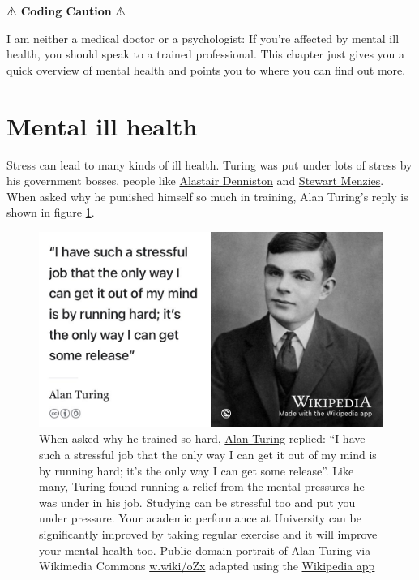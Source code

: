 \documentclass[
]{book}
\begin{document}
⚠️ \textbf{Coding Caution} ⚠️

I am neither a medical doctor or a psychologist: If you're affected by mental ill health, you should speak to a trained professional. This chapter just gives you a quick overview of mental health and points you to where you can find out more.

\hypertarget{illhealth}{%
\section{Mental ill health}\label{illhealth}}

Stress can lead to many kinds of ill health. Turing was put under lots of stress by his government bosses, people like \href{https://en.wikipedia.org/wiki/Alastair_Denniston}{Alastair Denniston} and \href{https://en.wikipedia.org/wiki/Stewart_Menzies}{Stewart Menzies}. \citep{imitationgame} When asked why he punished himself so much in training, Alan Turing's reply is shown in figure \ref{fig:turing-stress-fig}.

\begin{figure}

{\centering \includegraphics[width=0.99\linewidth]{images/turunning-machine} 

}

\caption{When asked why he trained so hard, \href{https://en.wikipedia.org/wiki/Alan_Turing}{Alan Turing} replied: ``I have such a stressful job that the only way I can get it out of my mind is by running hard; it's the only way I can get some release''. Like many, Turing found running a relief from the mental pressures he was under in his job. \citep{kottke} Studying can be stressful too and put you under pressure. Your academic performance at University can be significantly improved by taking regular exercise and it will improve your mental health too. Public domain portrait of Alan Turing via Wikimedia Commons \href{https://w.wiki/oZx}{w.wiki/oZx} adapted using the \href{https://apps.apple.com/gb/app/wikipedia/id324715238}{Wikipedia app}}\label{fig:turing-stress-fig}
\end{figure}
\end{document}
